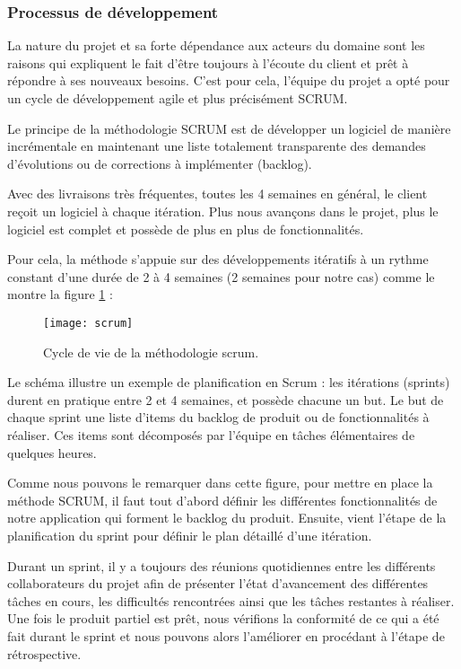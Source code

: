 \subsubsection{Processus de développement}
La nature du projet et sa forte dépendance aux acteurs du domaine sont les raisons qui expliquent le fait d’être toujours à l’écoute du client et prêt à répondre à ses nouveaux besoins. C’est pour cela, l’équipe du projet a opté pour un cycle de développement agile et plus précisément SCRUM.

\medskip

Le principe de la méthodologie SCRUM est de développer un logiciel de manière incrémentale en maintenant une liste totalement transparente des demandes d'évolutions ou de corrections à implémenter (backlog).

\medskip

Avec des livraisons très fréquentes, toutes les 4 semaines en général, le client reçoit un logiciel à chaque itération. Plus nous avançons dans le projet, plus le logiciel est complet et possède de plus en plus de fonctionnalités.

\medskip

Pour cela, la méthode s'appuie sur des développements itératifs à un rythme constant d'une durée de 2 à 4 semaines (2 semaines pour notre cas) comme le montre la figure \ref{fig:scrum} :

\begin{figure}[ht]
  \centering
  \texttt{[image: scrum]}
  \caption{Cycle de vie de la méthodologie scrum.}
  \label{fig:scrum}
\end{figure}
\FloatBarrier

Le schéma illustre un exemple de planification en Scrum : les itérations (sprints) durent en pratique entre 2 et 4 semaines, et possède chacune un but. Le but de chaque sprint une liste d'items du backlog de produit ou de fonctionnalités à réaliser. Ces items sont décomposés par l'équipe en tâches élémentaires de quelques heures.

\medskip

Comme nous pouvons le remarquer dans cette figure, pour mettre en place la méthode SCRUM, il faut tout d'abord définir les différentes fonctionnalités de notre application qui forment le backlog du produit. Ensuite, vient l'étape de la planification du sprint pour définir le plan détaillé d'une itération.

\medskip

Durant un sprint, il y a toujours des réunions quotidiennes entre les différents collaborateurs du projet afin de présenter l'état d'avancement des différentes tâches en cours, les difficultés rencontrées ainsi que les tâches restantes à réaliser. Une fois le produit partiel est prêt, nous vérifions la conformité de ce qui a été fait durant le sprint et nous pouvons alors l'améliorer en procédant à l'étape de rétrospective.

